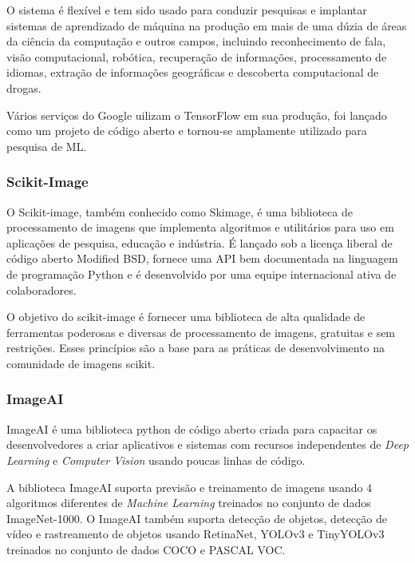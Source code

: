 O sistema é flexível e tem sido usado para conduzir pesquisas e implantar sistemas de aprendizado de máquina na produção em mais de uma dúzia de áreas da ciência da computação e outros campos, incluindo reconhecimento de fala, visão computacional, robótica, recuperação de informações, processamento de idiomas, extração de informações geográficas e descoberta computacional de drogas. \cite{abadi2016tensorflow}

Vários serviços do Google uilizam o TensorFlow em sua produção, foi lançado como um projeto de código aberto e tornou-se amplamente utilizado para pesquisa de ML.\cite{199317}


\subsubsection{Scikit-Image}

O Scikit-image, também conhecido como Skimage, é uma biblioteca de processamento de imagens que implementa algoritmos e utilitários para uso em aplicações de pesquisa, educação e indústria. É lançado sob a licença liberal de código aberto Modified BSD, fornece uma API bem documentada na linguagem de programação Python e é desenvolvido por uma equipe internacional ativa de colaboradores.

O objetivo do scikit-image é fornecer uma biblioteca de alta qualidade de ferramentas poderosas e diversas de processamento de imagens, gratuitas e sem restrições. Esses princípios são a base para as práticas de desenvolvimento na comunidade de imagens scikit.\cite{skimage}


\subsubsection{ImageAI}

ImageAI é uma biblioteca python de código aberto criada para capacitar os desenvolvedores a criar aplicativos e sistemas com recursos independentes de \textit{Deep Learning} e \textit{Computer Vision} usando poucas linhas de código.

A biblioteca ImageAI suporta previsão e treinamento de imagens usando 4 algoritmos diferentes de \textit{Machine Learning} treinados no conjunto de dados ImageNet-1000. O ImageAI também suporta detecção de objetos, detecção de vídeo e rastreamento de objetos usando RetinaNet, YOLOv3 e TinyYOLOv3 treinados no conjunto de dados COCO e PASCAL VOC.\cite{ImageAI}

